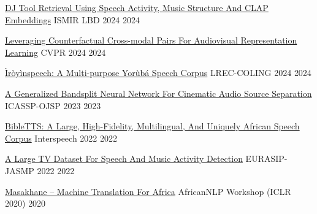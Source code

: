 
\begin{cvhonors}

  \cvhonor
    {\href{https://arxiv.org/pdf/2411.12209}{DJ Tool Retrieval Using Speech Activity, Music Structure And CLAP Embeddings}} %
    {ISMIR LBD 2024} %
    {} %
    {2024} %

  \cvhonor
    {\href{https://openaccess.thecvf.com/content/CVPR2024/papers/Singh_Looking_Similar_Sounding_Different_Leveraging_Counterfactual_Cross-Modal_Pairs_for_Audiovisual_CVPR_2024_paper.pdf}{Leveraging Counterfactual Cross-modal Pairs For Audiovisual Representation Learning}} %
    {CVPR 2024} %
    {} %
    {2024} %

  \cvhonor
    {\href{https://aclanthology.org/2024.lrec-main.812.pdf}{Ìròyìnspeech: A Multi-purpose Yorùbá Speech Corpus}} %
    {LREC-COLING 2024} %
    {} %
    {2024} %


  \cvhonor
    {\href{https://ieeexplore.ieee.org/stamp/stamp.jsp?arnumber=10342812}{A Generalized Bandsplit Neural Network For Cinematic Audio Source Separation}} %
    {ICASSP-OJSP 2023} %
    {} %
    {2023} %

  \cvhonor
    {\href{https://arxiv.org/pdf/2207.03546}{BibleTTS: A Large, High-Fidelity, Multilingual, And Uniquely African Speech Corpus}} %
    {Interspeech 2022} %
    {} %
    {2022} %

  \cvhonor
    {\href{https://link.springer.com/article/10.1186/s13636-022-00253-8}{A Large TV Dataset For Speech And Music Activity Detection}} %
    {EURASIP-JASMP 2022} %
    {} %
    {2022} %

  \cvhonor
    {\href{https://arxiv.org/pdf/2003.11529}{Masakhane -- Machine Translation For Africa}} %
    {AfricanNLP Workshop (ICLR 2020)} %
    {} %
    {2020} %


\end{cvhonors}
